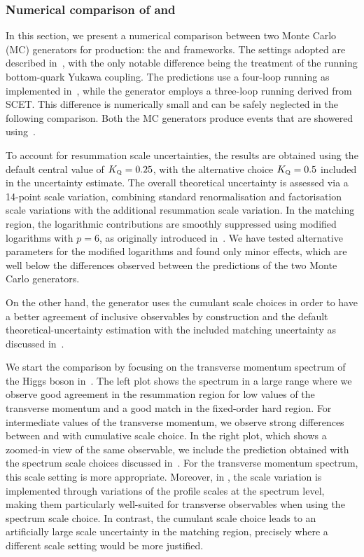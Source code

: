 \documentclass[11pt,a4paper]{article}
\begin{document}
\subsubsection{Numerical comparison of \minnlo{} and \GENEVA{}}
In this section, we present a numerical comparison between two Monte Carlo (MC) generators for \bbtoH{} production: the \minnlo{} and \GENEVA{} frameworks. The settings adopted are described in~, with the only notable difference being the treatment of the running bottom-quark Yukawa coupling. The \minnlo{} predictions use a four-loop running as implemented in~, while the \GENEVA{} generator employs a three-loop running derived from SCET. This difference is numerically small and can be safely neglected in the following comparison. Both the MC generators produce events that are showered using~.

To account for resummation scale uncertainties, the \minnlo{} results are obtained using the default central value of $\KQ = 0.25$, with the alternative choice $\KQ = 0.5$ included in the uncertainty estimate. The overall theoretical uncertainty is assessed via a 14-point scale variation, combining standard renormalisation and factorisation scale variations with the additional resummation scale variation. In the matching region, the logarithmic contributions are smoothly suppressed using modified logarithms with $p=6$, as originally introduced in~. We have tested alternative parameters for the modified logarithms and found only minor effects, which are well below the differences observed between the predictions of the two Monte Carlo generators.

On the other hand, the \GENEVA{} generator uses the cumulant scale choices in order to have a better agreement of inclusive observables by construction and the default theoretical-uncertainty estimation with the included matching uncertainty as discussed in~.

We start the comparison by focusing on the transverse momentum spectrum of the Higgs boson in~. The left plot shows the spectrum in a large range where we observe good agreement in the resummation region for low values of the transverse momentum and a good match in the fixed-order hard region. For intermediate values of the transverse momentum, we observe strong differences between \minnlo{} and \GENEVA{} with cumulative scale choice. In the right plot, which shows a zoomed-in view of the same observable, we include the \GENEVA{} prediction obtained with the spectrum scale choices discussed in~. For the transverse momentum spectrum, this scale setting is more appropriate. Moreover, in \GENEVA{}, the scale variation is implemented through variations of the profile scales at the spectrum level, making them particularly well-suited for transverse observables when using the spectrum scale choice. In contrast, the cumulant scale choice leads to an artificially large scale uncertainty in the matching region, precisely where a different scale setting would be more justified.
\end{document}
